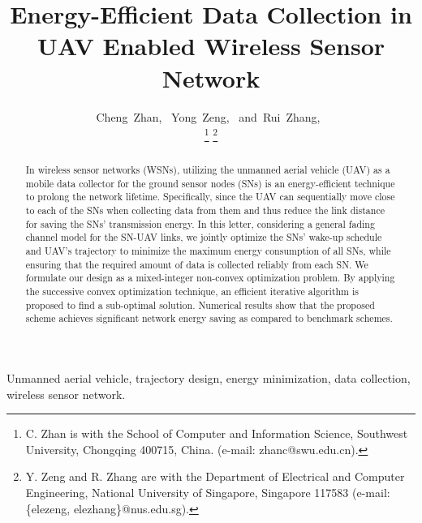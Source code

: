 \documentclass[journal]{IEEEtran}
\begin{document}
\title{\LARGE Energy-Efficient Data Collection in UAV Enabled Wireless Sensor Network}


\author{Cheng~Zhan,~
        Yong~Zeng,~
        and~Rui~Zhang,~%

\thanks{C. Zhan is with the School of Computer and Information Science, Southwest University,
Chongqing 400715, China. (e-mail: zhanc@swu.edu.cn).}
\thanks{Y. Zeng and R. Zhang are with the Department of Electrical and Computer
Engineering, National University of Singapore, Singapore 117583 (e-mail:
\{elezeng, elezhang\}@nus.edu.sg).}}



\maketitle
\thispagestyle{empty}

\begin{abstract}
In wireless sensor networks (WSNs), utilizing the unmanned aerial vehicle (UAV) as a mobile data collector for the ground sensor nodes (SNs) is an energy-efficient technique to prolong the network lifetime. Specifically, since the UAV can sequentially move close to each of the SNs when collecting data from them and thus reduce the link distance for saving the SNs' transmission energy. In this letter, considering a general fading channel model for the SN-UAV links, we jointly optimize the SNs' wake-up schedule and UAV's trajectory to minimize the maximum energy consumption of all SNs, while ensuring that the required amount of data is collected reliably from each SN. We formulate our design as a mixed-integer non-convex optimization problem. By applying the successive convex optimization
technique, an efficient iterative algorithm is proposed to find a sub-optimal solution. Numerical results show that the proposed scheme achieves significant network energy saving as compared to benchmark schemes.
\end{abstract}

\begin{IEEEkeywords}
Unmanned aerial vehicle, trajectory design, energy minimization, data collection, wireless sensor network.
\end{IEEEkeywords}
\vspace{-0.22in}

\IEEEpeerreviewmaketitle
\end{document}
